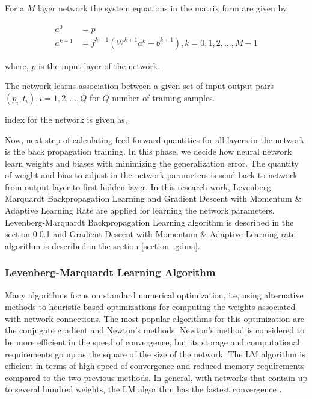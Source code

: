 For a $M$ layer network the system equations in the matrix form are given by

\begin{align}\label{equation_feed_forward_step_in_matrix}
a^{0}&=p\\
a^{k+1}&= f^{k+1}(W^{k+1}a^k+b^{k+1}), k=0,1,2,...,M-1
\end{align}

where, $p$ is the input layer of the network.

The network learns association between a given set of input-output pairs ${(p_i,t_i), i=1,2,...,Q}$ for $Q$ number of training samples.



 index for the network is given as,

Now, next step of calculating feed forward quantities for all layers in the network is the back propagation training. In this phase, we decide how neural network learn weights and biases with minimizing the generalization error. The quantity of weight and bias to adjust in the network parameters is send back to network from output layer to first hidden layer. In this research work, Levenberg-Marquardt Backpropagation Learning and Gradient Descent with Momentum \& Adaptive Learning Rate are applied for learning the network parameters. Levenberg-Marquardt Backpropagation Learning algorithm is described in the section \ref{section_lm_algorithm} and Gradient Descent with Momentum \& Adaptive Learning rate algorithm is described in the section \ref{section_gdma}.

\subsubsection{Levenberg-Marquardt Learning Algorithm}\label{section_lm_algorithm}

Many algorithms focus on standard numerical optimization, i.e, using alternative methods to heuristic based optimizations for computing the weights associated with network connections. The most popular algorithms for this optimization are the conjugate gradient and Newton’s methods. Newton’s method is considered to be more efficient in the speed of convergence, but its storage and  computational requirements go up as the square of the size of the network.
The LM algorithm is efficient in terms of high speed of convergence and reduced memory requirements compared to the two previous methods. In general, with networks that contain up to several hundred weights, the LM algorithm has the fastest convergence \cite{Hagan1994}.

